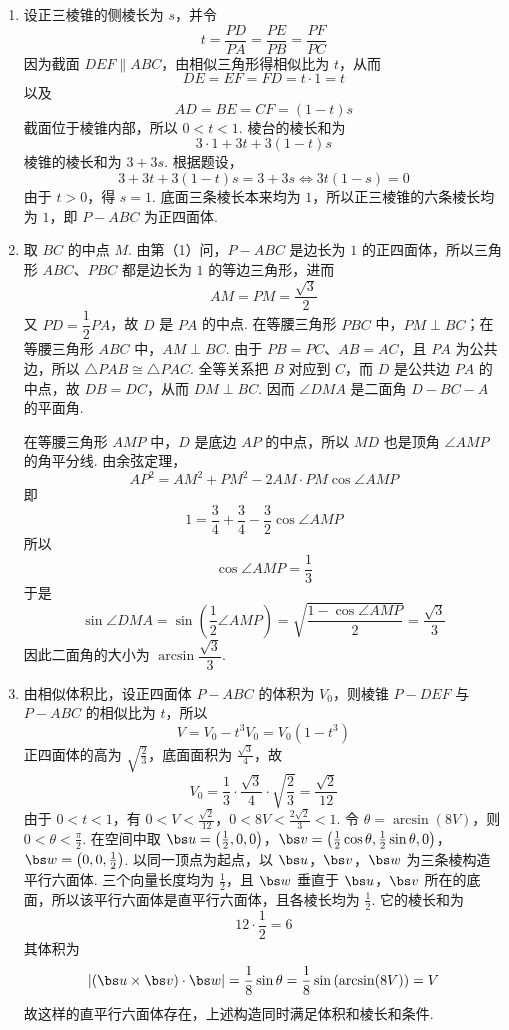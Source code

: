 \begin{solution}
\begin{enumerate}
\item 设正三棱锥的侧棱长为 \(s\)，并令
\[
t=\frac{PD}{PA}=\frac{PE}{PB}=\frac{PF}{PC}
\]
因为截面 \(DEF\parallel ABC\)，由相似三角形得相似比为 \(t\)，从而
\[
DE=EF=FD=t\cdot1=t
\]
以及
\[
AD=BE=CF=(1-t)s
\]
截面位于棱锥内部，所以 \(0<t<1\). 棱台的棱长和为
\[
3\cdot1+3t+3(1-t)s
\]
棱锥的棱长和为 \(3+3s\). 根据题设，
\[
3+3t+3(1-t)s=3+3s
\Longleftrightarrow 3t(1-s)=0
\]
由于 \(t>0\)，得 \(s=1\). 底面三条棱长本来均为 \(1\)，所以正三棱锥的六条棱长均为 \(1\)，即 \(P-ABC\) 为正四面体.

\item 取 \(BC\) 的中点 \(M\). 由第（1）问，\(P-ABC\) 是边长为 \(1\) 的正四面体，所以三角形 \(ABC\)、\(PBC\) 都是边长为 \(1\) 的等边三角形，进而
\[
AM=PM=\frac{\sqrt3}{2}
\]
又 \(PD=\dfrac12PA\)，故 \(D\) 是 \(PA\) 的中点. 在等腰三角形 \(PBC\) 中，\(PM\perp BC\)；在等腰三角形 \(ABC\) 中，\(AM\perp BC\). 由于 \(PB=PC\)、\(AB=AC\)，且 \(PA\) 为公共边，所以 \(\triangle PAB\cong\triangle PAC\). 全等关系把 \(B\) 对应到 \(C\)，而 \(D\) 是公共边 \(PA\) 的中点，故 \(DB=DC\)，从而 \(DM\perp BC\). 因而 \(\angle DMA\) 是二面角 \(D-BC-A\) 的平面角.

在等腰三角形 \(AMP\) 中，\(D\) 是底边 \(AP\) 的中点，所以 \(MD\) 也是顶角 \(\angle AMP\) 的角平分线. 由余弦定理，
\[
AP^2=AM^2+PM^2-2AM\cdot PM\cos\angle AMP
\]
即
\[
1=\frac34+\frac34-\frac32\cos\angle AMP
\]
所以
\[
\cos\angle AMP=\frac13
\]
于是
\[
\sin\angle DMA
=\sin\left(\frac12\angle AMP\right)
=\sqrt{\frac{1-\cos\angle AMP}{2}}
=\frac{\sqrt3}{3}
\]
因此二面角的大小为 \(\arcsin\dfrac{\sqrt3}{3}\).

\item 由相似体积比，设正四面体 \(P-ABC\) 的体积为 \(V_0\)，则棱锥 \(P-DEF\) 与 \(P-ABC\) 的相似比为 \(t\)，所以
\[
V=V_0-t^3V_0=V_0(1-t^3)
\]
正四面体的高为 \(\sqrt{\frac23}\)，底面面积为 \(\frac{\sqrt3}{4}\)，故
\[
V_0=\frac13\cdot\frac{\sqrt3}{4}\cdot\sqrt{\frac23}=\frac{\sqrt2}{12}
\]
由于 \(0<t<1\)，有
\(0<V<\frac{\sqrt2}{12}\)，\(0<8V<\frac{2\sqrt2}{3}<1\).
令 \(\theta=\arcsin(8V)\)，则 \(0<\theta<\frac{\pi}{2}\). 在空间中取
\(\bs u=\left(\frac12,0,0\right)\)，\(\bs v=\left(\frac12\cos\theta,\frac12\sin\theta,0\right)\)，\(\bs w=\left(0,0,\frac12\right)\).
以同一顶点为起点，以 \(\bs u\)，\(\bs v\)，\(\bs w\) 为三条棱构造平行六面体. 三个向量长度均为 \(\frac12\)，且 \(\bs w\) 垂直于 \(\bs u\)，\(\bs v\) 所在的底面，所以该平行六面体是直平行六面体，且各棱长均为 \(\frac12\). 它的棱长和为
\[
12\cdot\frac12=6
\]
其体积为
\[
\left|(\bs u\times\bs v)\cdot\bs w\right|
=\frac18\sin\theta
=\frac18\sin\left(\arcsin(8V)\right)=V
\]
故这样的直平行六面体存在，上述构造同时满足体积和棱长和条件.
\end{enumerate}
\end{solution}

